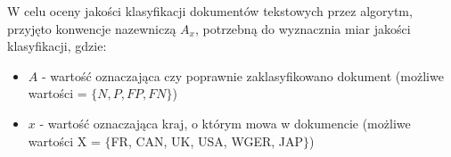 \documentclass{classrep}
\begin{document}

W celu oceny jakości klasyfikacji dokumentów tekstowych \cite{teksty} przez algorytm, przyjęto konwencje nazewniczą $A_x$, potrzebną do wyznacznia miar jakości klasyfikacji, gdzie:
\begin{itemize}
\item $A$ - wartość oznaczająca czy poprawnie zaklasyfikowano dokument (możliwe wartości = $\{N, P, FP, FN\}$)
\item $x$ - wartość oznaczająca kraj, o którym mowa w dokumencie (możliwe wartości X = $\{$FR, CAN, UK, USA, WGER, JAP$\}$)
\end{itemize} \hfill \break

\end{document}
